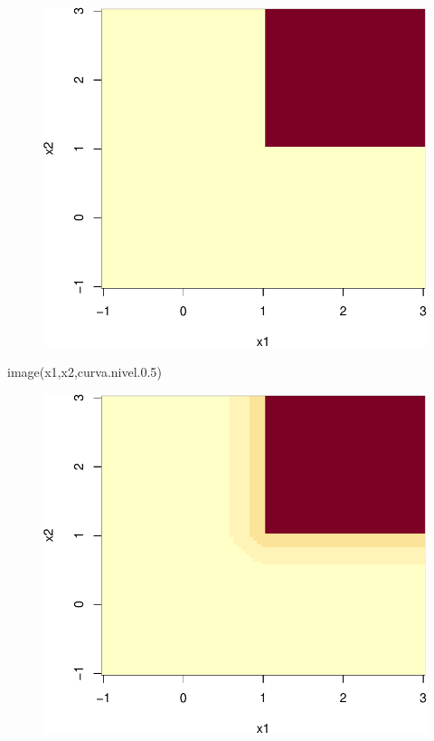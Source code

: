 \documentclass[
  letterpaper,
  DIV=11,
  numbers=noendperiod]{scrreprt}
\newenvironment{Shaded}{\begin{snugshade}}{\end{snugshade}}
\newcommand{\FloatTok}[1]{\textcolor[rgb]{0.68,0.00,0.00}{#1}}
\newcommand{\FunctionTok}[1]{\textcolor[rgb]{0.28,0.35,0.67}{#1}}
\newcommand{\NormalTok}[1]{\textcolor[rgb]{0.00,0.23,0.31}{#1}}
\begin{document}
\begin{figure}[H]

{\centering \includegraphics{6_files/figure-pdf/unnamed-chunk-1-1.pdf}

}

\end{figure}

\begin{Shaded}
\begin{Highlighting}[]
\FunctionTok{image}\NormalTok{(x1,x2,curva.nivel.}\FloatTok{0.5}\NormalTok{)}
\end{Highlighting}
\end{Shaded}

\begin{figure}[H]

{\centering \includegraphics{6_files/figure-pdf/unnamed-chunk-1-2.pdf}

}

\end{figure}
\end{document}
